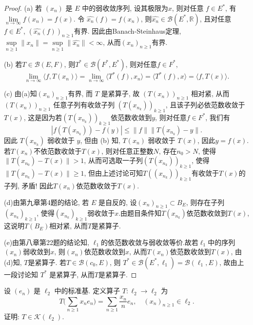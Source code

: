 \begin{proof}
    (a) 若 $(x_n)$ 是 $E$ 中的弱收敛序列, 设其极限为$x$, 
    则对任意 $f\in E^*$, 有 $\lim\limits_{n\rightarrow \infty}f(x_n)=f(x)$.
    令 $\widehat{x_n}(f)=f(x_n)$, 则$\widehat{x_n}\in\mathcal{B}(E^*,\mathbb{R})$, 
    且对任意 $f\in E^*$, $(\widehat{x_n}(f))_{n\geq 1}$有界. 因此由Banach-Steinhaus定理, 
    $\sup\limits_{n\geq 1}\|x_n\|=\sup\limits_{n\geq 1}\|\widehat{x_n}\|<\infty$, 
    从而$(x_n)_{n\geq 1}$有界. 

    (b) 若$T\in\mathcal{B}(E,F)$, 则$T^*\in\mathcal{B}(F^*,E^*)$, 则对任意$f\in F^*$, 
    \[\lim_{n\rightarrow \infty}\langle f,T(x_n)\rangle=\lim_{n\rightarrow \infty}\langle T^*(f),x_n\rangle=\langle T^*(f),x\rangle=\langle f,T(x)\rangle.\] 

    (c) 由(a)知$(x_n)_{n\geq 1}$有界, 而 $T$ 是紧算子, 故 $(T(x_n))_{n\geq 1}$ 相对紧, 
    从而 $(T(x_n))_{n\geq 1}$ 任意子列有收敛子列 $(T(x_{n_k}))_{k\geq 1 }$, 
    且该子列必依范数收敛于 $T(x)$, 这是因为若$(T(x_{n_k}))_{k\geq 1}$依范数收敛到$y$, 
    则对任意$f\in F^*$, 我们有
    \[|f(T(x_{n_k}))-f(y)|\leq \|f\|\|T(x_{n_k})-y\|.\]
    因此 $T(x_{n_k})$ 弱收敛于 $y$, 但由 (b) 知, $T(x_n)$ 弱收敛于 $T(x)$, 
    因此$y=f(x)$. 若$T(x_n)$不依范数收敛于$T(x)$, 则对任意正整数$N$, 存在$n_0>N$, 使得$\|T(x_{n_0})-T(x)\|>1$, 
    从而可选取一子列$(T(x_{n_k}))_{k\geq 1}$, 使得$\|T(x_{n_k})-T(x)\|\geq1$, 
    但由上述讨论可知$T((x_{n_k}))_{k\geq 1}$有收敛于$T(x)$的子列, 矛盾! 因此$T(x_n)$依范数收敛于$T(x)$.

    (d)由第九章第4题的结论, 若 $E$ 是自反的, 设$(x_n)_{n\geq 1}\subset B_E$, 则存在子列$(x_{n_k})_{k\geq 1}$,
    使得$(x_{n_k})_{k\geq1}$弱收敛于$x$.由题目条件知$T(x_{n_k})$依范数收敛到$T(x)$, 这说明$T(B_E)$相对紧, 从而$T$是紧算子.

    (e)由第八章第22题的结论知, $\ell_1$的依范数收敛与弱收敛等价.故若$\ell_1$中的序列$(x_n)$弱收敛到$x$, 
    则$(x_n)$依范数收敛到$x$, 从而$T(x_n)$依范数收敛到$T(x)$, 由(d)知, $T$是紧算子. 
    若$T\in \mathcal{B}(c_0,E)$, 则 $T^*\in \mathcal{B}(E^*,\ell_1)=\mathcal{B}(\ell_1,E)$, 
    故由上一段讨论知 $T^*$ 是紧算子, 从而$T$是紧算子.
\end{proof}



\begin{exercise}
    设 $(e_n)$ 是 $\ell_2$ 中的标准基. 定义算子 $T:\ell_2\rightarrow \ell_2$ 为
    \[T\biggl(\sum_{n\geq 1}x_n e_n\biggr)=\sum_{n\geq 1}\dfrac{x_n}{n}e_n,\quad (x_n)_{n\geq 1}\in \ell_2.\]
    证明: $T\in \mathcal{K}(\ell_2)$.
\end{exercise}

